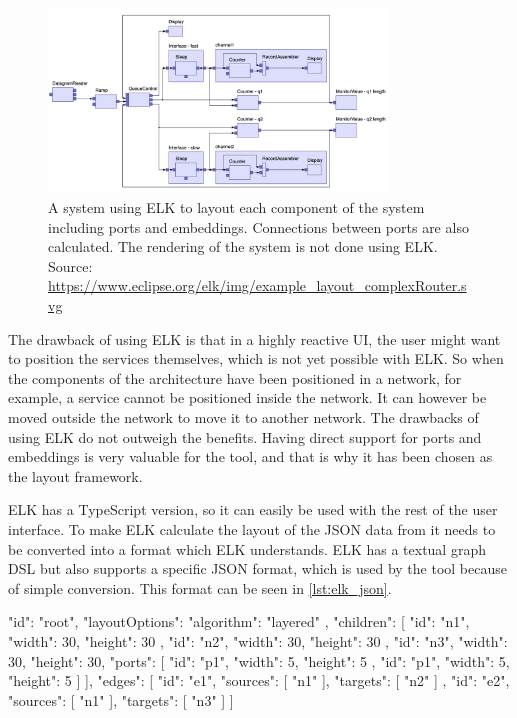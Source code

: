 \begin{figure}[h!]
    \center
    \includegraphics[width=0.80\textwidth]{figures/elk.png}
    \caption{A system using ELK to layout each component of the system including ports and embeddings. Connections between ports are also calculated. The rendering of the system is not done using ELK. Source: \url{https://www.eclipse.org/elk/img/example_layout_complexRouter.svg}}
    \label{figure:elk_example}
\end{figure}

The drawback of using ELK is that in a highly reactive UI, the user might want to position the services themselves, which is not yet possible with ELK.
So when the components of the architecture have been positioned in a network, for example, a service cannot be positioned inside the network. It can however be moved outside the network to move it to another network.
The drawbacks of using ELK do not outweigh the benefits. Having direct support for ports and embeddings is very valuable for the tool, and that is why it has been chosen as the layout framework.

ELK has a TypeScript version, so it can easily be used with the rest of the user interface. To make ELK calculate the layout of the JSON data from \javatoolname[] it needs to be converted into a format which ELK understands.
ELK has a textual graph DSL but also supports a specific JSON format, which is used by the tool because of simple conversion. This format can be seen in \cref{lst:elk_json}.

\begin{jsonlisting}[][caption={The ELK JSON format}, label={lst:elk_json}]
{
    "id": "root",
    "layoutOptions": { "algorithm": "layered" },
    "children": [
        { "id": "n1", "width": 30, "height": 30 },
        { "id": "n2", "width": 30, "height": 30 },
        {
            "id": "n3",
            "width": 30,
            "height": 30,
            "ports": [
                { "id": "p1", "width": 5, "height": 5 },
                { "id": "p1", "width": 5, "height": 5 }
            ]
        }
    ],
    "edges": [
        { "id": "e1", "sources": [ "n1" ], "targets": [ "n2" ] },
        { "id": "e2", "sources": [ "n1" ], "targets": [ "n3" ] }
    ]
}
\end{jsonlisting}

